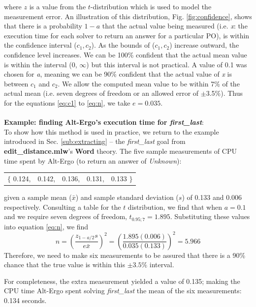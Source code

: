 where $z$ is a value from the $t$-distribution which is used to model the measurement error. 
An illustration of this distribution, Fig. \ref{fig:confidence}, shows that there is a probability $1-a$ that the actual value being measured (i.e. \textit{x}: the execution time for each solver to return an answer for a particular PO), is within the confidence interval ($c_1, c_2$). 
As the bounds of ($c_1, c_2$) increase outward, the confidence level increases.
We can be 100\% confident that the actual mean value is within the interval (0, $\infty$) but this interval is not practical.  
A value of 0.1 was chosen for \textit{a}, meaning we can be 90\% confident that the actual value of \textit{x} is between $c_1$ and $c_2$. 
We allow the computed mean value to be within 7\% of the actual mean (i.e. seven degrees of freedom or an allowed error of $\pm$3.5\%). Thus for the equations \ref{eq:c1} to \ref{eq:n}, we take $e = 0.035$.  \\ 
\\
\textbf{Example: finding Alt-Ergo's execution time for \textit{first\_last}}: \\
To show how this method is used in practice, we return to the example introduced in Sec. \ref{sub:extracting} -- the \textit{first\_last} goal from \textbf{edit\_distance.mlw}'s \textbf{Word} theory.
The five sample measurements of CPU time spent by Alt-Ergo (to return an answer of \textit{Unknown}):

\begin{tabularx}
	{\textwidth}{@{}YYYYY@{}}
	 $\lbrace$ 0.124, & 0.142, & 0.136, & 0.131, & 0.133 $\rbrace$
\end{tabularx} 

given a sample mean ($\bar{x}$) and sample standard deviation ($s$) of 0.133 and 0.006 respectively. 
Consulting a table for the $t$ distribution, we find that when $a=0.1$ and we require seven degrees of freedom, $t_{0.95;7} = 1.895$.
Substituting these values into equation \ref{eq:n}, we find
\begin{equation}
	n =  \left(\frac{z_{1-a/2}s}{e\bar{x}}\right)^2
	= \left(\frac{1.895(0.006)}{0.035(0.133)}\right)^2 = 5.966
\end{equation}    
Therefore, we need to make six measurements to be assured that there is a 90\% chance that the true value is within this $\pm3.5\%$ interval.

For completeness, the extra measurement yielded a value of 0.135; making the CPU time Alt-Ergo spent solving \textit{first\_last} the mean of the six measurements: 0.134 seconds.

